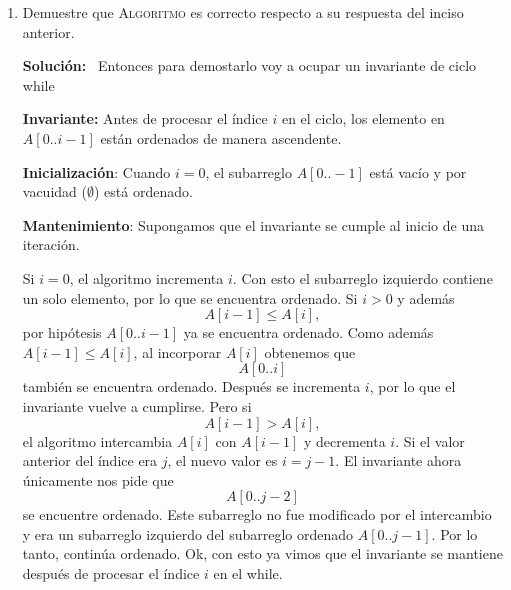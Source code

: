\documentclass{article}
\newcommand{\Sol}{\textbf{Soluci\'on:} \ }
\begin{document}
\begin{enumerate}
\begin{enumerate}
                 \textbf{Y en más alto nivel}: el algoritmo ordena el arreglo de manera ascendente, desplazando elementos hacia la izquierda hasta que cada elemento encuentre su posición correcta.

                 
            
            \item Demuestre que \textsc{Algoritmo} es correcto respecto a su
                respuesta del inciso anterior.

                 \Sol Entonces para demostarlo voy a ocupar un invariante de ciclo while
                
                \medskip
                 \textbf{Invariante:} Antes de procesar el índice $i$ en el ciclo, los elemento en $A[0..i-1]$ están ordenados de manera ascendente.
                
                 \textbf{Inicialización}: Cuando $i=0$, el subarreglo $A[0..-1]$ está vacío y por vacuidad ($\emptyset$) está ordenado.

                 \textbf{Mantenimiento}: Supongamos que el invariante se cumple al inicio de una iteración.
            
                 Si $i=0$, el algoritmo incrementa $i$. Con esto el subarreglo izquierdo contiene un
                 solo elemento, por lo que se encuentra ordenado.
                 Si $i>0$ y además
                 \[
                 A[i-1]\leq A[i],
                 \]
                 por hipótesis $A[0..i-1]$ ya se encuentra ordenado. Como además
                 $A[i-1]\leq A[i]$, al incorporar $A[i]$ obtenemos que
                 \[
                 A[0..i]
                 \]
                 también se encuentra ordenado. Después se incrementa $i$, por lo que
                 el invariante vuelve a cumplirse.
                 Pero si
                 \[
                 A[i-1]>A[i],
                 \]
                 el algoritmo intercambia $A[i]$ con $A[i-1]$ y decrementa $i$.
                 Si el valor anterior del índice era $j$, el nuevo valor es
                 $i=j-1$. El invariante ahora únicamente nos pide que
                 \[
                 A[0..j-2]
                 \]
                 se encuentre ordenado. Este subarreglo no fue modificado por el
                 intercambio y era un subarreglo izquierdo del subarreglo ordenado
                 $A[0..j-1]$. Por lo tanto, continúa ordenado.
                 Ok, con esto ya vimos que el invariante se mantiene después de procesar el índice $i$ en el while.
                 \medskip



\end{enumerate}
\end{enumerate}
\end{document}
